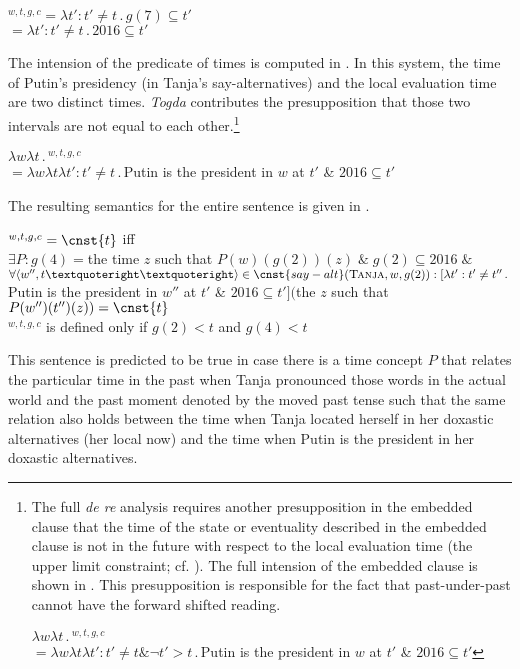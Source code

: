 \documentclass[output=paper,
modfonts,
newtxmath,
hidelinks
]{langscibook}
\begin{document}
\ea {}$^{w,t,g,c}$\tabto{2.3cm}${}=\lambda t':t'\neq t\,.\,g(7)\subseteq t'$\smallskip\\
\tabto{2.3cm}${}=\lambda t':t'\neq t\,.\,2016\subseteq t'$\label{ex38}
\z

\noindent The intension of the predicate of times is computed in . In this system, the time of Putin’s presidency (in Tanja’s say-alternatives) and the local evaluation time are two distinct times. \textit{Togda} contributes the presupposition that those two intervals are not equal to each other.\footnote{\label{fn11}The full \textit{de re} analysis requires another presupposition in the embedded clause that the time of the state or eventuality described in the embedded clause is not in the future with respect to the local evaluation time (the upper limit constraint; cf. \citealt{Abusch1997}). The full intension of the embedded clause is shown in . This presupposition is responsible for the fact that past-under-past cannot have the forward shifted reading.

\ea $\lambda w\lambda t\,.\,$$^{w,t,g,c}$\\
\hspace{0.5cm}${}=\lambda w\lambda t\lambda t':t'\neq t \&\neg t'>t\,.\,{}$Putin is the president in $w$ at $t'$ \& $2016\subseteq t'$\label{fnex1}
\z
}

\ea $\lambda w\lambda t\,.\,$$^{w,t,g,c}$\smallskip\\
\hspace{0.5cm}${}=\lambda w\lambda t\lambda t':t'\neq t\,.\,{}$Putin is the president in $w$ at $t'$ \& $2016\subseteq t'$\label{ex39}
\z

\noindent The resulting semantics for the entire sentence is given in .

\ea {}$^{w,t,g,c}=\cnst{t}$ iff\smallskip\\
$\exists P:g(4)={}$the time $z$ such that $P(w)(g(2))(z)\;\&\;g(2)\subseteq 2016\;\&$\\
$\forall\langle w'',t’’\rangle\in\cnst{say-alt}(\textsc{Tanja},w,g(2)): [\lambda t':t'\neq t''\,.\,{}$Putin is the president in $w''$ at $t'$ \& $2016\subseteq t']($the $z$ such that $P(w'')(t'')(z)) =\cnst{t}$\medskip\\
$^{w,t,g,c}$  is defined only if $g(2)<t$ and $g(4)<t$\label{ex40}
\z

\noindent This sentence is predicted to be true in case there is a time concept $P$ that relates the particular time in the past when Tanja pronounced those words in the actual world and the past moment denoted by the moved past tense such that the same relation also holds between the time when Tanja located herself in her doxastic alternatives (her local now) and the time when Putin is the president in her doxastic alternatives.
\end{document}
